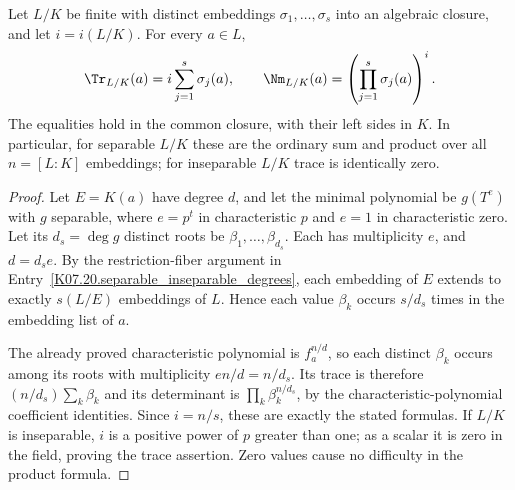 \begin{theorem}
Let $L/K$ be finite with distinct embeddings $\sigma_1,\ldots,\sigma_s$ into an algebraic closure, and let $i=i(L/K)$. For every $a\in L$,
\[
\Tr_{L/K}(a)=i\sum_{j=1}^s\sigma_j(a),\qquad
\Nm_{L/K}(a)=\left(\prod_{j=1}^s\sigma_j(a)\right)^i.
\]
The equalities hold in the common closure, with their left sides in $K$. In particular, for separable $L/K$ these are the ordinary sum and product over all $n=[L:K]$ embeddings; for inseparable $L/K$ trace is identically zero.
\end{theorem}
\begin{proof}
Let $E=K(a)$ have degree $d$, and let the minimal polynomial be $g(T^e)$ with $g$ separable, where $e=p^t$ in characteristic $p$ and $e=1$ in characteristic zero. Let its $d_s=\deg g$ distinct roots be $\beta_1,\ldots,\beta_{d_s}$. Each has multiplicity $e$, and $d=d_s e$. By the restriction-fiber argument in Entry~\ref{K07.20.separable_inseparable_degrees}, each embedding of $E$ extends to exactly $s(L/E)$ embeddings of $L$. Hence each value $\beta_k$ occurs $s/d_s$ times in the embedding list of $a$.

The already proved characteristic polynomial is $f_a^{n/d}$, so each distinct $\beta_k$ occurs among its roots with multiplicity $e n/d=n/d_s$. Its trace is therefore $(n/d_s)\sum_k\beta_k$ and its determinant is $\prod_k\beta_k^{n/d_s}$, by the characteristic-polynomial coefficient identities. Since $i=n/s$, these are exactly the stated formulas. If $L/K$ is inseparable, $i$ is a positive power of $p$ greater than one; as a scalar it is zero in the field, proving the trace assertion. Zero values cause no difficulty in the product formula.
\end{proof}

